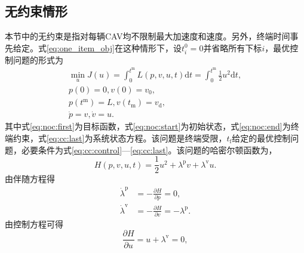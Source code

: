 \subsection{无约束情形}
\label{ssec:noc}
本节中的无约束是指对每辆CAV均不限制最大加速度和速度。另外，终端时间事先给定。式\eqref{eq:one_item_obj}在这种情形下，设$t_i^{0}=0$并省略所有下标$i$，最优控制问题的形式为
\begin{gather}
\min_{u} J(u)=\int_{0}^{t^\mathrm{m}}L(p,v,u,t)\mathrm{d}t=\int_{0}^{t^\mathrm{m}}\frac12 u^2\mathrm{d}t,\label{eq:noc:first}\\
p(0)=0, v(0)=v_0,\label{eq:noc:start}\\
p(t^\mathrm{m})=L, v(t_\mathrm{m})=v_\mathrm{d},\label{eq:noc:end}\\
\dot{p}=v, \dot{v}=u. \label{eq:noc:last}
\end{gather}
其中式\eqref{eq:noc:first}为目标函数，式\eqref{eq:noc:start}为初始状态，式\eqref{eq:noc:end}为终端约束，式\eqref{eq:cc:last}为系统状态方程。该问题是终端受限，$t_\mathrm{f}$给定的最优控制问题，必要条件为式\eqref{eq:cc:control}---\eqref{eq:cc:last}。该问题的哈密尔顿函数为，
\begin{equation}
H(p,v,u,t)=\frac12 u^2+\lambda^\mathrm{p}v + \lambda^\mathrm{v}u.
\end{equation}
由伴随方程得
\begin{align}
\dot{\lambda}^\mathrm{p}&=-\frac{\partial H}{\partial p}=0, \label{eq:dlp}\\
\dot{\lambda}^\mathrm{v}&=-\frac{\partial H}{\partial v}=-\lambda^\mathrm{p}. \label{eq:dlv}
\end{align}
由控制方程可得
\begin{equation}
\frac{\partial H}{\partial u}=u+\lambda^\mathrm{v}=0,
\label{eq:uwrtlv}
\end{equation}

